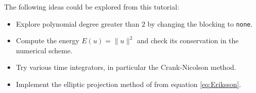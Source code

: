 \documentclass[a4paper,12pt]{article}
\begin{document}
The following ideas could be explored from this tutorial:
\begin{itemize}
\item Explore polynomial degree greater than $2$ by changing the blocking
to \lstinline{none}. 
\item Compute the energy $E(u) = \|u\|^2$ and check its conservation in
the numerical scheme. 
\item Try various time integrators, in particular the Crank-Nicolson method.
\item Implement the elliptic projection method of \cite{Eriksson} from
equation \eqref{eq:Eriksson}.
\end{itemize}



\end{document}
